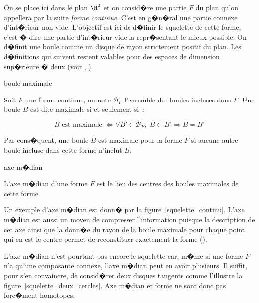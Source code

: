 On se place ici dans le plan $\R^2$ et on consid�re une partie $F$ du plan qu'on appellera par la suite \emph{forme continue}. C'est en g�n�ral une partie connexe d'int�rieur non vide. L'objectif est ici de d�finir le squelette de cette forme, c'est-�-dire une partie d'int�rieur vide la repr�sentant le mieux possible. On d�finit une boule comme un disque de rayon strictement positif du plan. Les d�finitions qui suivent restent valables pour des espaces de dimension sup�rieure � deux (voir , ).

        \begin{xdefinition}{boule maximale}
        \label{ske_def_boule_max}
        
        Soit $F$ une forme continue, on note $\mathcal{B}_F$ l'ensemble des boules incluses dans $F$. 
        Une boule $B$ est dite maximale si et seulement si~:
        
                        $$
                        B \text{ est maximale } \Longleftrightarrow \forall B' \in \mathcal{B}_F, 
                        \; B \subset B' \Longrightarrow B = B'
                        $$
        
        \end{xdefinition}

Par cons�quent, une boule $B$ est maximale pour la forme $F$ si aucune autre boule incluse dans cette forme n'inclut $B$.


            \begin{xdefinition}{axe m�dian}
            \label{ske_def_axe_med}

            L'axe m�dian d'une forme $F$ est le lieu des centres des boules maximales de cette forme.

            \end{xdefinition}


Un exemple d'axe m�dian est donn� par la figure~\ref{squelette_continu}. L'axe m�dian est aussi un moyen de compresser l'information puisque la description de cet axe ainsi que la donn�e du rayon de la boule maximale pour chaque point qui en est le centre permet de reconstituer exactement la forme ().


L'axe m�dian n'est pourtant pas encore le squelette car, m�me si une forme $F$ n'a qu'une composante connexe, l'axe m�dian peut en avoir plusieurs. Il suffit, pour s'en convaincre, de consid�rer deux disques tangents comme l'illustre la figure~\ref{squelette_deux_cercles}. Axe m�dian et forme ne sont donc pas forc�ment homotopes.



